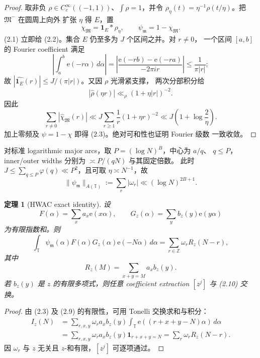 \documentclass[11pt,a4paper]{ctexart}
\newtheorem{theorem}{定理}[section]
\theoremstyle{definition}
\newcommand{\T}{\mathbb T}
\newcommand{\e}{\mathrm e}
\newcommand{\1}{\mathbf 1}
\begin{document}
\begin{proof}
取非负 $\rho\in C_c^\infty((-1,1))$、$\int\rho=1$，并令
$\rho_\eta(t)=\eta^{-1}\rho(t/\eta)$。把 $\mathfrak M^-$ 在圆周上向外
扩张 $\eta$ 得 $E$，置
\[
\chi_{\mathfrak M}=\1_E*\rho_\eta,\qquad
\psi_{\mathfrak m}=1-\chi_{\mathfrak M}.               \tag{2.4}
\]
(2.1) 立即给 (2.2)。集合 $E$ 仍至多为 $J$ 个区间之并。对 $r\ne0$，
一个区间 $[a,b]$ 的 Fourier coefficient 满足
\[
\left|\int_a^b\e(-r\alpha)\,d\alpha\right|
=\left|\frac{\e(-rb)-\e(-ra)}{-2\pi ir}\right|
\le\frac1{\pi|r|};                                    \tag{2.5}
\]
故 $|\widehat{\1_E}(r)|\le J/(\pi|r|)$。又因 $\rho$ 光滑紧支撑，
两次分部积分给
\[
|\widehat\rho(\eta r)|\ll_\rho(1+\eta|r|)^{-2}.       \tag{2.6}
\]
因此
\[
\sum_{r\ne0}|\widehat\chi_{\mathfrak M}(r)|
\ll J\sum_{r\ge1}\frac1r(1+\eta r)^{-2}
\ll J\left(1+\log\frac2\eta\right).                  \tag{2.7}
\]
加上零频及 $\psi=1-\chi$ 即得 (2.3)。绝对可和性也证明 Fourier 级数
一致收敛。
\end{proof}

对标准 logarithmic major arcs，取 $P=(\log N)^B$，中心为 $a/q$、
$q\le P$，inner/outer widths 分别为 $\asymp P/(qN)$ 与其固定倍数。
此时 $J\le\sum_{q\le P}\varphi(q)\ll P^2$，且可取 $\eta\asymp N^{-1}$，故
\[
\|\psi_{\mathfrak m}\|_{A(\T)}
:=\sum_r|\omega_r|\ll(\log N)^{2B+1}.                  \tag{2.8}
\]

\begin{theorem}[HWAC exact identity]
设
\[
F(\alpha)=\sum_xa_x\e(x\alpha),\qquad
G_z(\alpha)=\sum_yb_z(y)\e(y\alpha)                    \tag{2.9}
\]
为有限指数和。则
\[
\boxed{
\int_\T\psi_{\mathfrak m}(\alpha)F(\alpha)G_z(\alpha)
\e(-N\alpha)\,d\alpha
=\sum_{r\in\mathbb Z}\omega_rR_z(N-r),}               \tag{2.10}
\]
其中
\[
R_z(M)=\sum_{x+y=M}a_xb_z(y).                            \tag{2.11}
\]
若 $b_z(y)$ 是 $z$ 的有限多项式，则任意 coefficient extraction $[z^j]$
与 (2.10) 交换。
\end{theorem}

\begin{proof}
由 (2.3) 及 (2.9) 的有限性，可用 Tonelli 交换求和与积分：
\begin{align*}
I_z(N)
&=\sum_{r,x,y}\omega_ra_xb_z(y)
  \int_\T\e((r+x+y-N)\alpha)\,d\alpha\\
&=\sum_{r,x,y}\omega_ra_xb_z(y)\1_{r+x+y=N}
=\sum_r\omega_rR_z(N-r).
\end{align*}
因 $\omega_r$ 与 $z$ 无关且 $z$-和有限，$[z^j]$ 可逐项通过。
\end{proof}
\end{document}
